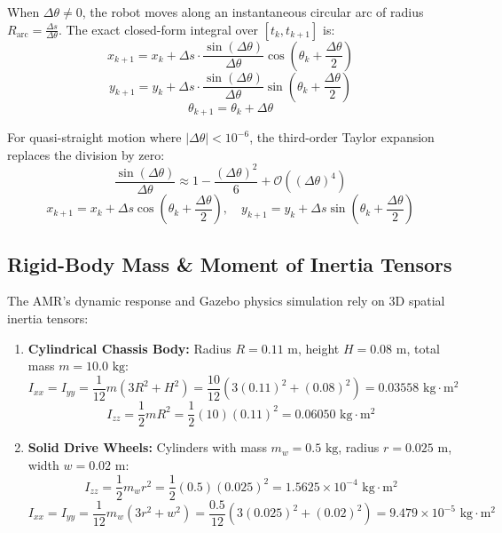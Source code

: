 \documentclass[10pt,a4paper]{article}
\begin{document}
When $\Delta \theta \neq 0$, the robot moves along an instantaneous circular arc of radius $R_{\text{arc}} = \frac{\Delta s}{\Delta \theta}$. The exact closed-form integral over $[t_k, t_{k+1}]$ is:
\begin{equation}
x_{k+1} = x_k + \Delta s \cdot \frac{\sin(\Delta\theta)}{\Delta\theta}\cos\left(\theta_k + \frac{\Delta\theta}{2}\right)
\end{equation}
\begin{equation}
y_{k+1} = y_k + \Delta s \cdot \frac{\sin(\Delta\theta)}{\Delta\theta}\sin\left(\theta_k + \frac{\Delta\theta}{2}\right)
\end{equation}
\begin{equation}
\theta_{k+1} = \theta_k + \Delta \theta
\end{equation}

For quasi-straight motion where $|\Delta\theta| < 10^{-6}$, the third-order Taylor expansion replaces the division by zero:
\begin{equation}
\frac{\sin(\Delta\theta)}{\Delta\theta} \approx 1 - \frac{(\Delta\theta)^2}{6} + \mathcal{O}((\Delta\theta)^4)
\end{equation}
\begin{equation}
x_{k+1} = x_k + \Delta s \cos\left(\theta_k + \frac{\Delta\theta}{2}\right), \quad y_{k+1} = y_k + \Delta s \sin\left(\theta_k + \frac{\Delta\theta}{2}\right)
\end{equation}

\subsection{Rigid-Body Mass \& Moment of Inertia Tensors}
The AMR's dynamic response and Gazebo physics simulation rely on 3D spatial inertia tensors:
\begin{enumerate}
    \item \textbf{Cylindrical Chassis Body:} Radius $R = 0.11\text{ m}$, height $H = 0.08\text{ m}$, total mass $m = 10.0\text{ kg}$:
    \begin{equation}
    I_{xx} = I_{yy} = \frac{1}{12}m(3R^2 + H^2) = \frac{10}{12}(3(0.11)^2 + (0.08)^2) = 0.03558\text{ kg}\cdot\text{m}^2
    \end{equation}
    \begin{equation}
    I_{zz} = \frac{1}{2}m R^2 = \frac{1}{2}(10)(0.11)^2 = 0.06050\text{ kg}\cdot\text{m}^2
    \end{equation}
    \item \textbf{Solid Drive Wheels:} Cylinders with mass $m_w = 0.5\text{ kg}$, radius $r = 0.025\text{ m}$, width $w = 0.02\text{ m}$:
    \begin{equation}
    I_{zz} = \frac{1}{2}m_w r^2 = \frac{1}{2}(0.5)(0.025)^2 = 1.5625 \times 10^{-4}\text{ kg}\cdot\text{m}^2
    \end{equation}
    \begin{equation}
    I_{xx} = I_{yy} = \frac{1}{12}m_w(3r^2 + w^2) = \frac{0.5}{12}(3(0.025)^2 + (0.02)^2) = 9.479 \times 10^{-5}\text{ kg}\cdot\text{m}^2
    \end{equation}
\end{enumerate}
\end{document}
